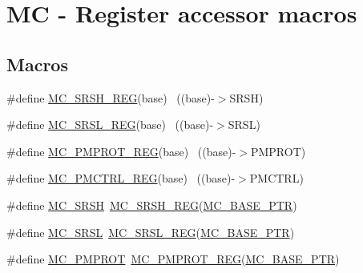 \hypertarget{group___m_c___register___accessor___macros}{}\section{MC -\/ Register accessor macros}
\label{group___m_c___register___accessor___macros}
\subsection*{Macros}
\begin{DoxyCompactItemize}
\item 
\#define \hyperlink{group___m_c___register___accessor___macros_ga1864ad8023b9154624af31a4c2a5895d}{M\+C\+\_\+\+S\+R\+S\+H\+\_\+\+R\+EG}(base)                                            ~((base)-\/$>$S\+R\+SH)
\item 
\#define \hyperlink{group___m_c___register___accessor___macros_ga8582409296554aec23ceb7b4a46eb877}{M\+C\+\_\+\+S\+R\+S\+L\+\_\+\+R\+EG}(base)                                            ~((base)-\/$>$S\+R\+SL)
\item 
\#define \hyperlink{group___m_c___register___accessor___macros_gabf474cc558ffa4ca7e65d184423d1d45}{M\+C\+\_\+\+P\+M\+P\+R\+O\+T\+\_\+\+R\+EG}(base)                                        ~((base)-\/$>$P\+M\+P\+R\+OT)
\item 
\#define \hyperlink{group___m_c___register___accessor___macros_ga40227780510380fa54e9ae6e30217b0e}{M\+C\+\_\+\+P\+M\+C\+T\+R\+L\+\_\+\+R\+EG}(base)                                        ~((base)-\/$>$P\+M\+C\+T\+RL)
\item 
\#define \hyperlink{group___m_c___register___accessor___macros_ga1d8e24d1263749b6f73f3afe5ee2178d}{M\+C\+\_\+\+S\+R\+SH}~\hyperlink{group___m_c___register___accessor___macros_ga1864ad8023b9154624af31a4c2a5895d}{M\+C\+\_\+\+S\+R\+S\+H\+\_\+\+R\+EG}(\hyperlink{group___m_c___peripheral_gaaceb8e18ec89863925b35b4e058bcd7e}{M\+C\+\_\+\+B\+A\+S\+E\+\_\+\+P\+TR})
\item 
\#define \hyperlink{group___m_c___register___accessor___macros_gaae7435dd9b07fb2e6ba71f7c069db587}{M\+C\+\_\+\+S\+R\+SL}~\hyperlink{group___m_c___register___accessor___macros_ga8582409296554aec23ceb7b4a46eb877}{M\+C\+\_\+\+S\+R\+S\+L\+\_\+\+R\+EG}(\hyperlink{group___m_c___peripheral_gaaceb8e18ec89863925b35b4e058bcd7e}{M\+C\+\_\+\+B\+A\+S\+E\+\_\+\+P\+TR})
\item 
\#define \hyperlink{group___m_c___register___accessor___macros_ga8947242639ef0efd5dc4a5f6b1af4d26}{M\+C\+\_\+\+P\+M\+P\+R\+OT}~\hyperlink{group___m_c___register___accessor___macros_gabf474cc558ffa4ca7e65d184423d1d45}{M\+C\+\_\+\+P\+M\+P\+R\+O\+T\+\_\+\+R\+EG}(\hyperlink{group___m_c___peripheral_gaaceb8e18ec89863925b35b4e058bcd7e}{M\+C\+\_\+\+B\+A\+S\+E\+\_\+\+P\+TR})

\end{DoxyCompactItemize}
